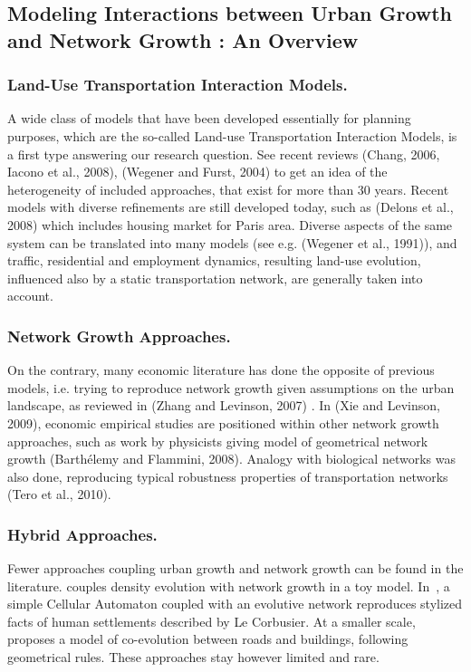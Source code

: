 \subsection{Modeling Interactions between Urban Growth and Network Growth : An Overview}

\subsubsection{Land-Use Transportation Interaction Models.}

A wide class of models that have been developed essentially for planning purposes, which are the so-called Land-use Transportation Interaction Models, is a first type answering our research question. See recent reviews (Chang, 2006, Iacono et al., 2008), (Wegener and Furst, 2004) to get an idea of the heterogeneity of included approaches, that exist for more than 30 years. Recent models with diverse refinements are still developed today, such as (Delons et al., 2008) which includes housing market for Paris area. Diverse aspects of the same system can be translated into many models (see e.g. (Wegener et al., 1991)), and traffic, residential and employment dynamics, resulting land-use evolution, influenced also by a static transportation network, are generally taken into account.

\subsubsection{Network Growth Approaches.}

On the contrary, many economic literature has done the opposite of previous models, i.e. trying to reproduce network growth given assumptions on the urban landscape, as reviewed in (Zhang and Levinson, 2007) . In (Xie and Levinson, 2009), economic empirical studies are positioned within other network growth approaches, such as work by physicists giving model of geometrical network growth (Barthélemy and Flammini, 2008). Analogy with biological networks was also done, reproducing typical robustness properties of transportation networks (Tero et al., 2010).

\subsubsection{Hybrid Approaches.}

Fewer approaches coupling urban growth and network growth can be found in the literature. \cite{barthelemy2009co} couples density evolution with network growth in a toy model. In~\cite{raimbault2014hybrid}, a simple Cellular Automaton coupled with an evolutive network reproduces stylized facts of human settlements described by Le Corbusier. At a smaller scale, \cite{achibet2014model} proposes a model of co-evolution between roads and buildings, following geometrical rules. These approaches stay however limited and rare.

